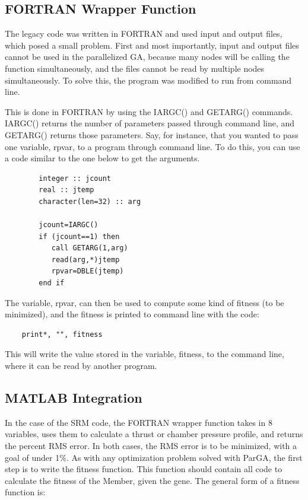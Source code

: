 \documentclass[conference]{IEEEtran}
\begin{document}
\subsection{FORTRAN Wrapper Function}

The legacy code was written in FORTRAN and used input and output files, which posed a small problem.  First and most importantly, input and output files cannot be used in the parallelized GA, because many nodes will be calling the function simultaneously, and the files cannot be read by multiple nodes simultaneously.  To solve this, the program was modified to run from command line.  

This is done in FORTRAN by using the IARGC() and GETARG() commands.  IARGC() returns the number of parameters passed through command line, and GETARG() returns those parameters.  Say, for instance, that you wanted to pass one variable, rpvar, to a program through command line.  To do this, you can use a code similar to the one below to get the arguments.

\begin{minipage}{0.43\textwidth}
\begin{lstlisting}
        integer :: jcount
        real :: jtemp
        character(len=32) :: arg
        
        jcount=IARGC()
        if (jcount==1) then
           call GETARG(1,arg)
           read(arg,*)jtemp
           rpvar=DBLE(jtemp)
        end if
\end{lstlisting}
\end{minipage}

The variable, rpvar, can then be used to compute some kind of fitness (to be minimized), and the fitness is printed to command line with the code:

\begin{minipage}{0.43\textwidth}
\begin{lstlisting}
	print*, "", fitness
\end{lstlisting}
\end{minipage}

This will write the value stored in the variable, fitness, to the command line, where it can be read by another program.  

\subsection{MATLAB Integration}

In the case of the SRM code, the FORTRAN wrapper function takes in 8 variables, uses them to calculate a thrust or chamber pressure profile, and returns the percent RMS error.  In both cases, the RMS error is to be minimized, with a goal of under 1\%.  As with any optimization problem solved with ParGA, the first step is to write the fitness function.   This function should contain all code to calculate the fitness of the Member, given the gene.  The general form of a fitness function is:
\end{document}
